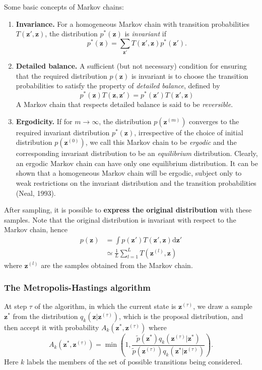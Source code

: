 \documentclass[a4paper]{book}
\newcommand{\ud}{\mathrm{d}}
\renewcommand{\bf}{\mathbf}
\newcommand{\imp}[1]{\textit{#1}}
\begin{document}
Some basic concepts of Markov chains:
\begin{enumerate}
	\item \textbf{Invariance.} For a homogeneous Markov chain with transition probabilities $T(\bf{z}',\bf{z})$, the distribution $p^*(\bf{z})$ is \imp{invariant} if
	\begin{equation}
		p^*(\bf{z}) = \sum_{\bf{z}'} T(\bf{z}',\bf{z})p^*(\bf{z'}).
	\end{equation}
	\item \textbf{Detailed balance.} A sufficient (but not necessary) condition for ensuring that the required distribution $p(\bf{z})$ is invariant is to choose the transition probabilities to satisfy the property of \imp{detailed balance}, defined by
	\begin{equation}
		p^*(\bf{z})T(\bf{z,z'}) = p^*(\bf{z'})T(\bf{z',z})
	\end{equation}
	A Markov chain that respects detailed balance is said to be \imp{reversible}.
	\item \textbf{Ergodicity.} If for $m \rightarrow \infty$, the distribution $p(\bf{z}^{(m)})$ converges to the required invariant distribution $p^*(\bf{z})$, irrespective of the choice of initial distribution $p(\bf{z}^{(0)})$, we call this Markov chain to be \imp{ergodic} and the corresponding invariant distribution to be an \imp{equilibrium} distribution. Clearly, an ergodic Markov chain can have only one equilibrium distribution. It can be shown that a homogeneous Markov chain will be ergodic, subject only to weak restrictions on the invariant distribution and the transition probabilities (Neal, 1993).
\end{enumerate}

After sampling, it is possible to \textbf{express the original distribution} with these samples. Note that the original distribution is invariant with respect to the Markov chain, hence
\begin{align}
	p(\bf{z}) &= \int p(\bf{z'}) T(\bf{z'},\bf{z}) \ud \bf{z}' \\
	&\simeq \frac{1}{L} \sum_{l=1}^L T(\bf{z}^{(l)},\bf{z})
\end{align}
where $\bf{z}^{(l)}$ are the samples obtained from the Markov chain.


\subsubsection{The Metropolis-Hastings algorithm}
At step $\tau$ of the algorithm, in which the current state is $\bf{z}^{(\tau)}$, we draw a sample $\bf{z}^*$ from the distribution $q_k(\bf{z}|\bf{z}^{(\tau)})$, which is the proposal distribution, and then accept it with probability $A_k(\bf{z}^*,\bf{z}^{(\tau)})$ where
\begin{equation}
	A_k(\bf{z}^*,\bf{z}^{(\tau)}) = \min \left(  1, \frac{\tilde{p}(\bf{z}^*) q_k(\bf{z}^{(\tau)}|\bf{z}^*)}{\tilde{p}(\bf{z}^{(\tau)})q_k(\bf{z}^*|\bf{z}^{(\tau)})} \right).
\end{equation}
Here $k$ labels the members of the set of possible transitions being considered.
\end{document}
